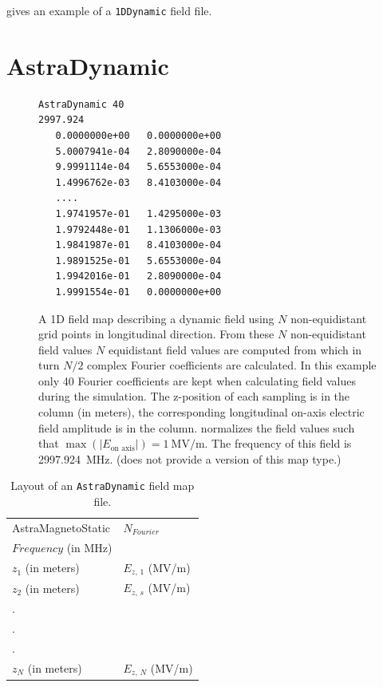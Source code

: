  gives an example of a \texttt{1DDynamic} field file.

\clearpage

\section{AstraDynamic}
\label{sec:AstraDynamic}
\begin{figure}[h]
\begin{fmpage}
\begin{verbatim}
AstraDynamic 40
2997.924
   0.0000000e+00   0.0000000e+00
   5.0007941e-04   2.8090000e-04
   9.9991114e-04   5.6553000e-04
   1.4996762e-03   8.4103000e-04
   ....
   1.9741957e-01   1.4295000e-03
   1.9792448e-01   1.1306000e-03
   1.9841987e-01   8.4103000e-04
   1.9891525e-01   5.6553000e-04
   1.9942016e-01   2.8090000e-04
   1.9991554e-01   0.0000000e+00
\end{verbatim}
\end{fmpage}
\caption[Example of an ASTRA compatible dynamic field map]{A 1D field map describing a dynamic field using $N$
  non-equidistant grid points in longitudinal direction. From these $N$ non-equidistant field values $N$ equidistant
  field values are computed from which in turn $N/2$ complex Fourier coefficients are calculated. In this example
  only 40 Fourier coefficients are kept when calculating field values during the simulation. The z-position of each
  sampling is in the  column (in meters), the corresponding longitudinal on-axis electric field amplitude
  is in the  column. \opalt normalizes the field values such that $\max(|E_{\text{on axis}}|) = \SI{1}{\mega\volt/\meter}$.
  The frequency of this field is \SI{2997.924}{\mega\hertz}. (\opalt does not provide a  version of this map type.)
}
\label{fig:AstraDynamic}
\end{figure}

\begin{table}[h!]
    \caption{Layout of an \texttt{AstraDynamic} field map file.}
    \label{tab:AstraDynamic}
    \begin{center}
    \begin{tabular}{ll}
      \hline
      AstraMagnetoStatic & $N_{Fourier}$ \\
      $Frequency$ (in MHz) & \\
      $z_{1}$ (in meters) & $E_{z,\,1}$ (MV/m) \\
      $z_{2}$ (in meters) & $E_{z,\,s}$ (MV/m) \\
      . & \\
      . & \\
      . & \\
      $z_{N}$ (in meters) & $E_{z,\,N}$ (MV/m) \\
      \hline
    \end{tabular}
    \end{center}
\end{table}


